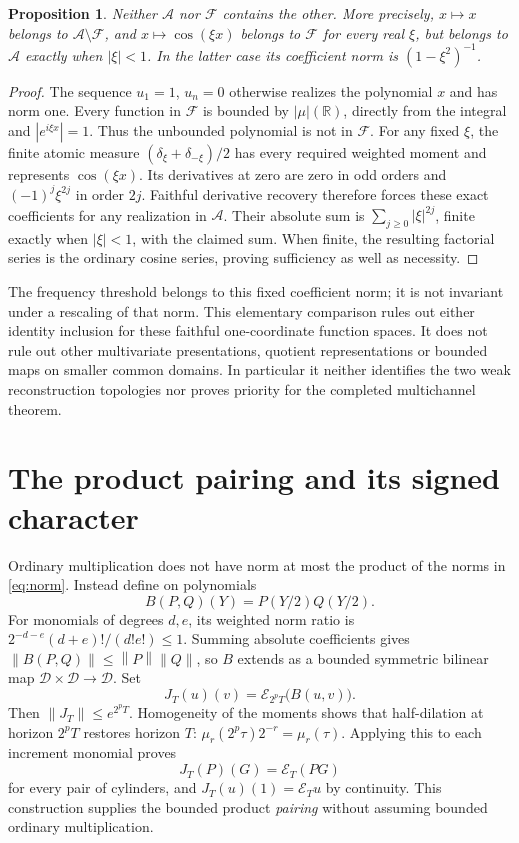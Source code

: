 \documentclass[11pt]{article}
\newtheorem{proposition}[theorem]{Proposition}
\theoremstyle{remark}\newtheorem{remark}[theorem]{Remark}
\newcommand{\R}{\mathbb R}\newcommand{\N}{\mathbb N}
\newcommand{\D}{\mathcal D}\newcommand{\E}{\mathcal E}
\newcommand{\norm}[1]{\left\lVert#1\right\rVert}
\begin{document}
\begin{proposition}
Neither $\mathcal A$ nor $\mathcal F$ contains the other. More
precisely, $x\mapsto x$ belongs to $\mathcal A\setminus\mathcal F$,
and $x\mapsto\cos(\xi x)$ belongs to $\mathcal F$ for every real
$\xi$, but belongs to $\mathcal A$ exactly when $|\xi|<1$.
In the latter case its coefficient norm is $(1-\xi^2)^{-1}$.
\end{proposition}
\begin{proof}
The sequence $u_1=1$, $u_n=0$ otherwise realizes the polynomial
$x$ and has norm one. Every function in $\mathcal F$ is bounded
by $|\mu|(\R)$, directly from the integral and $|e^{i\xi x}|=1$.
Thus the unbounded polynomial is not in $\mathcal F$.
For any fixed $\xi$, the finite atomic measure
$(\delta_\xi+\delta_{-\xi})/2$ has every required weighted moment
and represents $\cos(\xi x)$. Its derivatives at zero are zero
in odd orders and $(-1)^j\xi^{2j}$ in order $2j$.
Faithful derivative recovery therefore forces these exact
coefficients for any realization in $\mathcal A$.
Their absolute sum is $\sum_{j\geq0}|\xi|^{2j}$, finite exactly
when $|\xi|<1$, with the claimed sum. When finite, the resulting
factorial series is the ordinary cosine series, proving sufficiency
as well as necessity.
\end{proof}
The frequency threshold belongs to this fixed coefficient norm;
it is not invariant under a rescaling of that norm. This elementary
comparison rules out either identity inclusion for these faithful
one-coordinate function spaces. It does not rule out other
multivariate presentations, quotient representations or bounded
maps on smaller common domains. In particular it neither identifies
the two weak reconstruction topologies nor proves priority for the
completed multichannel theorem.

\section{The product pairing and its signed character}
Ordinary multiplication does not have norm at most the product
of the norms in \eqref{eq:norm}. Instead define on polynomials
\[
 B(P,Q)(Y)=P(Y/2)Q(Y/2).
\]
For monomials of degrees $d,e$, its weighted norm ratio is
$2^{-d-e}(d+e)!/(d!e!)\leq1$. Summing absolute coefficients
gives $\norm{B(P,Q)}\leq\norm P\norm Q$, so $B$ extends
as a bounded symmetric bilinear map $\D\times\D\to\D$.
Set
\begin{equation}\label{eq:pairing}
 J_T(u)(v)=\E_{2^pT}\big(B(u,v)\big).
\end{equation}
Then $\norm{J_T}\leq e^{2^pT}$. Homogeneity of the moments shows
that half-dilation at horizon $2^pT$ restores horizon $T$:
$\mu_r(2^p\tau)2^{-r}=\mu_r(\tau)$.
Applying this to each increment monomial proves
\begin{equation}\label{eq:actualpair}
 J_T(P)(G)=\E_T(PG)
\end{equation}
for every pair of cylinders, and $J_T(u)(1)=\E_Tu$ by continuity.
This construction supplies the bounded product \emph{pairing}
without assuming bounded ordinary multiplication.
\end{document}

